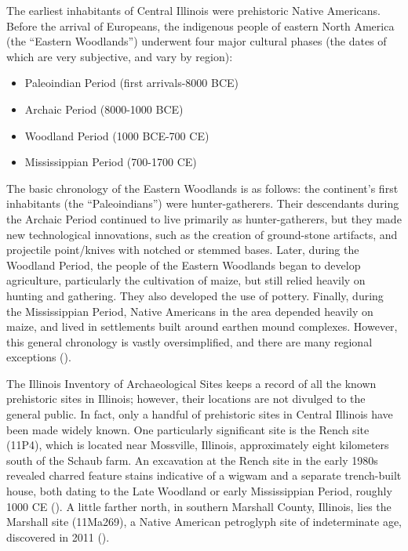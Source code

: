 
The earliest inhabitants of Central Illinois were prehistoric Native Americans. Before the arrival of Europeans, the indigenous people of eastern North America (the “Eastern Woodlands”) underwent four major cultural phases (the dates of which are very subjective, and vary by region):

\begin{itemize}
	\item Paleoindian Period (first arrivals-8000 BCE)
	\item Archaic Period (8000-1000 BCE)
	\item Woodland Period (1000 BCE-700 CE)
	\item Mississippian Period (700-1700 CE)
\end{itemize}

The basic chronology of the Eastern Woodlands is as follows: the continent’s first inhabitants (the “Paleoindians”) were hunter-gatherers. Their descendants during the Archaic Period continued to live primarily as hunter-gatherers, but they made new technological innovations, such as the creation of ground-stone artifacts, and projectile point/knives with notched or stemmed bases. Later, during the Woodland Period, the people of the Eastern Woodlands began to develop agriculture, particularly the cultivation of maize, but still relied heavily on hunting and gathering. They also developed the use of pottery. Finally, during the Mississippian Period, Native Americans in the area depended heavily on maize, and lived in settlements built around earthen mound complexes. However, this general chronology is vastly oversimplified, and there are many regional exceptions (\cite{gibbon1998}).

The Illinois Inventory of Archaeological Sites keeps a record of all the known prehistoric sites in Illinois; however, their locations are not divulged to the general public. In fact, only a handful of prehistoric sites in Central Illinois have been made widely known. One particularly significant site is the Rench site (11P4), which is located near Mossville, Illinois, approximately eight kilometers south of the Schaub farm. An excavation at the Rench site in the early 1980s revealed charred feature stains indicative of a wigwam and a separate trench-built house, both dating to the Late Woodland or early Mississippian Period, roughly 1000 CE (\cite{mcconaughy1985}). A little farther north, in southern Marshall County, Illinois, lies the Marshall site (11Ma269), a Native American petroglyph site of indeterminate age, discovered in 2011 (\cite{wagner2013}).

